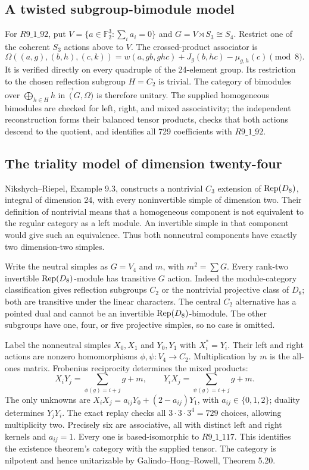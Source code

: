 \subsection{A twisted subgroup-bimodule model}
For $R9\_1\_92$, put $V=\{a\in\mathbb F_2^3:\sum_i a_i=0\}$ and
$G=V\rtimes S_3\cong S_4$. Restrict one of the coherent $S_3$ actions
above to $V$. The crossed-product associator is
\[
 \Omega((a,g),(b,h),(c,k))
 =w(a,gb,ghc)+J_g(b,hc)-\mu_{g,h}(c)\pmod8.
\]
It is verified directly on every quadruple of the 24-element group. Its
restriction to the chosen reflection subgroup $H=C_2$ is trivial. The
category of bimodules over $\bigoplus_{h\in H}h$ in $\Vec(G,\Omega)$
is therefore unitary. The supplied homogeneous bimodules are checked for
left, right, and mixed associativity; the independent reconstruction forms
their balanced tensor products, checks that both actions descend to the
quotient, and identifies all 729 coefficients with $R9\_1\_92$.

\subsection{The triality model of dimension twenty-four}
Nikshych--Riepel, Example 9.3, constructs a nontrivial $C_3$ extension
of $\operatorname{Rep}(D_8)$, integral of dimension 24, with every noninvertible simple
of dimension two. Their definition of nontrivial means that a homogeneous
component is not equivalent to the regular category as a left module.
An invertible simple in that component would give such an equivalence.
Thus both nonneutral components have exactly two dimension-two simples.

Write the neutral simples as $G=V_4$ and $m$, with $m^2=\sum G$.
Every rank-two invertible $\operatorname{Rep}(D_8)$-module has transitive $G$ action.
Indeed the module-category classification gives reflection subgroups $C_2$
or the nontrivial projective class of $D_8$; both are transitive under the
linear characters. The central $C_2$ alternative has a pointed dual and
cannot be an invertible $\operatorname{Rep}(D_8)$-bimodule. The other subgroups have
one, four, or five projective simples, so no case is omitted.

Label the nonneutral simples $X_0,X_1$ and $Y_0,Y_1$ with $X_i^*=Y_i$.
Their left and right actions are nonzero homomorphisms
$\phi,\psi:V_4\to C_2$. Multiplication by $m$ is the all-ones matrix.
Frobenius reciprocity determines the mixed products:
\[
 X_iY_j=\sum_{\phi(g)=i+j}g+m,\qquad
 Y_iX_j=\sum_{\psi(g)=i+j}g+m.
\]
The only unknowns are
$X_iX_j=a_{ij}Y_0+(2-a_{ij})Y_1$, with $a_{ij}\in\{0,1,2\}$;
duality determines $Y_jY_i$. The exact replay checks all
$3\cdot3\cdot3^4=729$ choices, allowing multiplicity two. Precisely six
are associative, all with distinct left and right kernels and $a_{ij}=1$.
Every one is based-isomorphic to $R9\_1\_117$. This identifies the
existence theorem's category with the supplied tensor. The category is
nilpotent and hence unitarizable by Galindo--Hong--Rowell, Theorem 5.20.


